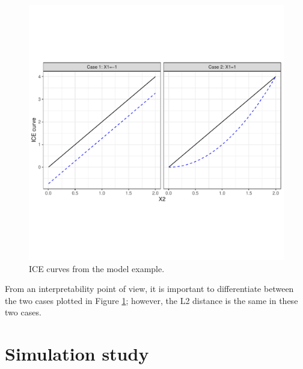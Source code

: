\documentclass[smallextended,natbib]{svjour3}\usepackage[]{graphicx}\usepackage[]{xcolor}
\newcommand{\1}[1]{\mathbbm{1}_{#1}}
\begin{document}
\begin{figure}[hbpt]
\centering
\includegraphics[trim=0cm 4cm 0cm 3cm, clip, scale=.7]{figures/fig-toyexample.pdf}
\caption{ICE curves from the model example. \label{iceej} }
\end{figure}
From an interpretability point of view, it is important to differentiate between the two cases plotted in Figure \ref{iceej}; however, the L2 distance is the same in these two cases. 

\section{Simulation study \label{simstudy}}
\end{document}
